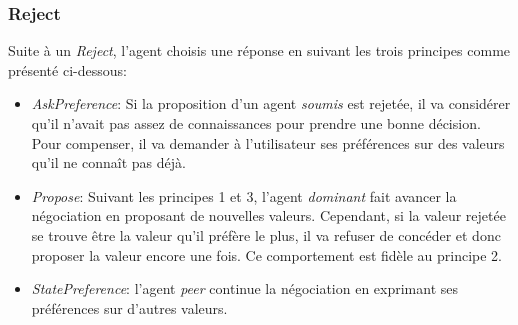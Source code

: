 	
	\subsubsection{Reject}
	Suite à un \emph{Reject}, l'agent choisis une réponse en suivant les trois principes comme présenté ci-dessous:
	\begin{itemize}
		\item \emph{AskPreference}: Si la proposition d'un agent \emph{soumis} est rejetée, il va considérer qu'il n'avait pas assez de connaissances pour prendre une bonne décision. Pour compenser, il va demander à l'utilisateur ses préférences sur des valeurs qu'il ne connaît pas déjà. 
		
		\item \emph{Propose}: Suivant les principes 1 et 3, l'agent \emph{dominant} fait avancer la négociation en proposant de nouvelles valeurs. Cependant, si la valeur rejetée se trouve être la valeur qu'il préfère le plus, il va refuser de concéder et donc proposer la valeur encore une fois. Ce comportement est fidèle au principe 2. 
		
		\item \emph{StatePreference}: l'agent \emph{peer} continue la négociation en exprimant ses préférences sur d'autres valeurs. 
	\end{itemize}	
	
